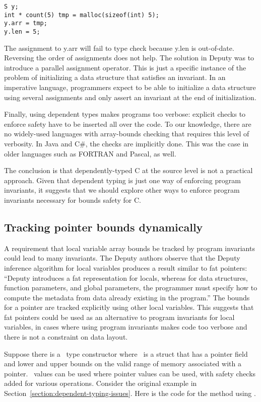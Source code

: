 \begin{verbatim}
S y;
int * count(5) tmp = malloc(sizeof(int) 5);
y.arr = tmp;
y.len = 5;
\end{verbatim}

The assignment to y.arr will fail to type check because y.len is
out-of-date. Reversing the order of assignments does not help. The
solution in Deputy was to introduce a parallel assignment operator. This
is just a specific instance of the problem of initializing a data
structure that satisfies an invariant. In an imperative language,
programmers expect to be able to initialize a data structure using
several assignments and only assert an invariant at the end of
initialization.

Finally, using dependent types makes programs too verbose: explicit
checks to enforce safety have to be inserted all over the code. To our
knowledge, there are no widely-used languages with array-bounds checking
that requires this level of verbosity. In Java and C\#, the checks are
implicitly done. This was the case in older languages such as FORTRAN
and Pascal, as well.

The conclusion is that dependently-typed C at the source level is
not a practical approach. Given that dependent typing is just one way of 
enforcing program invariants,
it suggests that we should explore other ways to enforce program
invariants necessary for bounds safety for C.

\subsection{Tracking pointer bounds dynamically}

A requirement that local variable array bounds be tracked by program
invariants could lead to many invariants. The Deputy authors observe
that the Deputy inference algorithm for local variables produces a
result similar to fat pointers: ``Deputy introduces a fat representation
for locals, whereas for data structures, function parameters, and global
parameters, the programmer must specify how to compute the metadata from
data already existing in the program.'' The bounds for a pointer are
tracked explicitly using other local variables. This suggests that fat
pointers could be used as an alternative to program invariants for local
variables, in cases where using program invariants makes code too
verbose and there is not a constraint on data layout.

Suppose there is a \spanptr\ type constructor where
\spanptr\ is a struct that has a pointer field and lower and
upper bounds on the valid range of memory associated with a pointer.
\spanptr\ values can be used where pointer values can be
used, with safety checks added for various operations. Consider the
original example in Section~\ref{section:dependent-typing-issues}. 
Here is the code for the method using
\spanptr.


